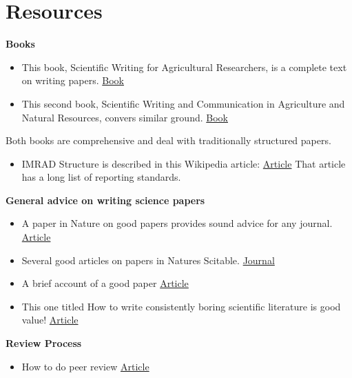 \documentclass[
]{book}
\providecommand{\tightlist}{%
  \setlength{\itemsep}{0pt}\setlength{\parskip}{0pt}}
\begin{document}
\hypertarget{resources-1}{%
\section{Resources}\label{resources-1}}

\textbf{Books}

\begin{itemize}
\item
  This book, Scientific Writing for Agricultural Researchers, is a complete text on writing papers. \href{https://www.coraf.org/documents/CTA116_scientificwritingbook\%20FINAL\%20nov\%202012.pdf}{Book}
\item
  This second book, Scientific Writing and Communication in Agriculture and Natural Resources, convers similar ground. \href{https://link.springer.com/content/pdf/10.1007\%2F978-3-319-03101-9.pdf}{Book}
\end{itemize}

Both books are comprehensive and deal with traditionally structured papers.

\begin{itemize}
\tightlist
\item
  IMRAD Structure is described in this Wikipedia article:
  \href{https://en.wikipedia.org/wiki/IMRAD}{Article} That article has a long list of reporting standards.
\end{itemize}

\textbf{General advice on writing science papers}

\begin{itemize}
\item
  A paper in Nature on good papers provides sound advice for any journal. \href{https://media.nature.com/original/magazine-assets/d41586-018-02404-4/d41586-018-02404-4.pdf}{Article}
\item
  Several good articles on papers in Natures Scitable. \href{https://www.nature.com/scitable/topic/scientific-communication-14121566/}{Journal}
\item
  A brief account of a good paper \href{https://www.nature.com/articles/nmeth.4532}{Article}
\item
  This one titled How to write consistently boring scientific literature is good value! \href{https://onlinelibrary.wiley.com/doi/pdf/10.1111/j.0030-1299.2007.15674.x}{Article}
\end{itemize}

\textbf{Review Process}

\begin{itemize}
\tightlist
\item
  How to do peer review \href{https://www.nature.com/articles/d41586-018-06991-0}{Article}
\end{itemize}
\end{document}

